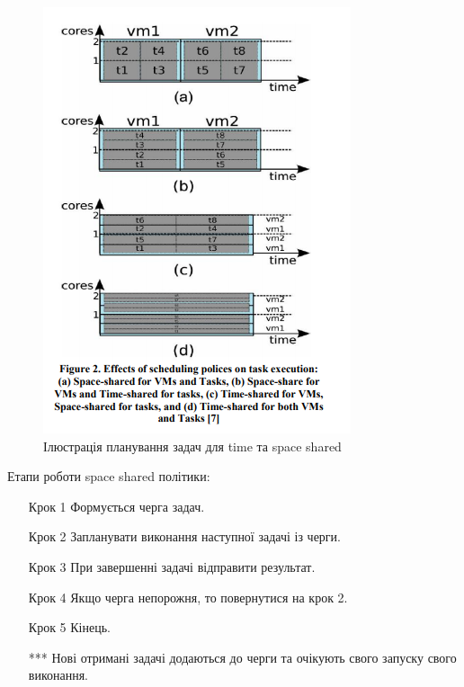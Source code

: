 \begin{figure}[H]
	\centering
	\includegraphics[width=\textwidth]{task_analysis/img/time_space_shared}
	\caption{Ілюстрація планування задач для time та space shared }
	\label{fig:time_space_shared}
\end{figure}


Етапи роботи space shared політики:
\begin{itemize}
	\item[Крок 1] Формується черга задач.
	\item[Крок 2] Запланувати виконання наступної задачі із черги.
	\item[Крок 3] При завершенні задачі відправити результат.
	\item[Крок 4] Якщо черга непорожня, то повернутися на крок 2.
	\item[Крок 5] Кінець.
	\item[***] Нові отримані задачі додаються до черги та очікують свого запуску свого виконання.
\end{itemize}

